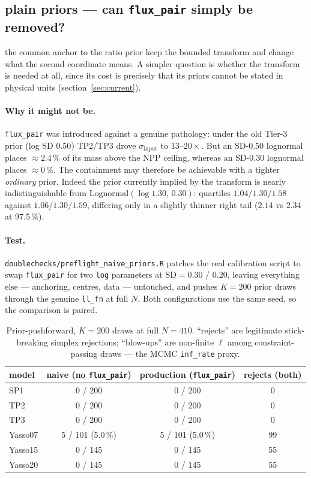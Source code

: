 \documentclass[11pt]{article}
\newcommand{\sinput}{\sigma_{\mathrm{input}}}
\begin{document}
\subsection*{plain priors --- can \texttt{flux\_pair} simply be removed?}

the common anchor to the ratio prior keep the bounded transform and change what the second coordinate means. A simpler
question is whether the transform is needed at all, since its cost is precisely that its priors
cannot be stated in physical units (section~\ref{sec:current}).

\paragraph{Why it might not be.} \texttt{flux\_pair} was introduced against a genuine pathology:
under the old Tier-3 prior (log SD $0.50$) TP2/TP3 drove $\sinput$ to $13$--$20\times$. But an
SD-$0.50$ lognormal places $\approx 2.4\,\%$ of its mass above the NPP ceiling, whereas an
SD-$0.30$ lognormal places $\approx 0\,\%$. The containment may therefore be achievable with a
tighter \emph{ordinary} prior. Indeed the prior currently implied by the transform is nearly
indistinguishable from $\mathrm{Lognormal}(\log 1.30,\,0.30)$: quartiles $1.04/1.30/1.58$ against
$1.06/1.30/1.59$, differing only in a slightly thinner right tail ($2.14$ vs $2.34$ at 97.5\,\%).

\paragraph{Test.} \texttt{doublechecks/preflight\_naive\_priors.R} patches the real calibration
script to swap \texttt{flux\_pair} for two \texttt{log} parameters at
$\mathrm{SD} = 0.30$ / $0.20$, leaving everything else --- anchoring, centres, data --- untouched,
and pushes $K=200$ prior draws through the genuine \texttt{ll\_fn} at full $N$. Both
configurations use the same seed, so the comparison is paired.

\begin{table}[H]\centering\small
\caption{Prior-pushforward, $K=200$ draws at full $N=410$. ``rejects'' are legitimate
stick-breaking simplex rejections; ``blow-ups'' are non-finite $\ell$ among constraint-passing
draws --- the MCMC \texttt{inf\_rate} proxy.}
\begin{tabular}{lccc}
\toprule
model & naive (no \texttt{flux\_pair}) & production (\texttt{flux\_pair}) & rejects (both)\\
\midrule
SP1     & 0 / 200        & 0 / 200        & 0\\
TP2     & 0 / 200        & 0 / 200        & 0\\
TP3     & 0 / 200        & 0 / 200        & 0\\
Yasso07 & 5 / 101 (5.0\,\%) & 5 / 101 (5.0\,\%) & 99\\
Yasso15 & 0 / 145        & 0 / 145        & 55\\
Yasso20 & 0 / 145        & 0 / 145        & 55\\
\bottomrule
\end{tabular}
\end{table}
\end{document}
